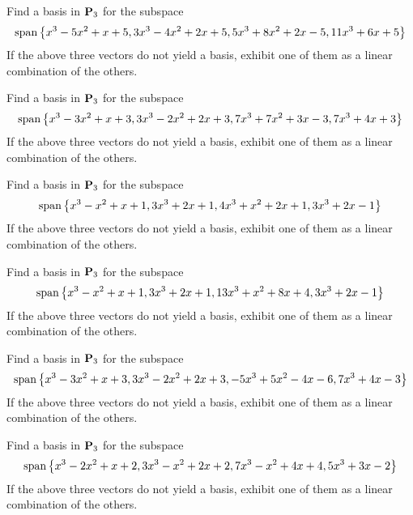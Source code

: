 \begin{ex}
  Find a basis in $\mathbf{P}_{3}$ for the subspace
  \begin{equation*}
    \sspan\set{
      x^{3}-5x^{2}+x+5,3x^{3}-4x^{2}+2x+5,5x^{3}+8x^{2}+2x-5,11x^{3}+6x+5}
  \end{equation*}
  If the above three vectors do not yield a basis, exhibit one of them
  as a linear combination of the others.
\end{ex}

\begin{ex}
  Find a basis in $\mathbf{P}_{3}$ for the subspace
  \begin{equation*}
    \sspan\set{
      x^{3}-3x^{2}+x+3,3x^{3}-2x^{2}+2x+3,7x^{3}+7x^{2}+3x-3,7x^{3}+4x+3}
  \end{equation*}
  If the above three vectors do not yield a basis, exhibit one of them
  as a linear combination of the others.
\end{ex}

\begin{ex}
  Find a basis in $\mathbf{P}_{3}$ for the subspace
  \begin{equation*}
    \sspan\set{
      x^{3}-x^{2}+x+1,3x^{3}+2x+1,4x^{3}+x^{2}+2x+1,3x^{3}+2x-1}
  \end{equation*}
  If the above three vectors do not yield a basis, exhibit one of them
  as a linear combination of the others.
\end{ex}

\begin{ex}
  Find a basis in $\mathbf{P}_{3}$ for the subspace
  \begin{equation*}
    \sspan\set{
      x^{3}-x^{2}+x+1,3x^{3}+2x+1,13x^{3}+x^{2}+8x+4,3x^{3}+2x-1}
  \end{equation*}
  If the above three vectors do not yield a basis, exhibit one of them
  as a linear combination of the others.
\end{ex}

\begin{ex}
  Find a basis in $\mathbf{P}_{3}$ for the subspace
  \begin{equation*}
    \sspan\set{
      x^{3}-3x^{2}+x+3,3x^{3}-2x^{2}+2x+3,-5x^{3}+5x^{2}-4x-6,7x^{3}+4x-3}
  \end{equation*}
  If the above three vectors do not yield a basis, exhibit one of them
  as a linear combination of the others.
\end{ex}

\begin{ex}
  Find a basis in $\mathbf{P}_{3}$ for the subspace
  \begin{equation*}
    \sspan\set{
      x^{3}-2x^{2}+x+2,3x^{3}-x^{2}+2x+2,7x^{3}-x^{2}+4x+4,5x^{3}+3x-2}
  \end{equation*}
  If the above three vectors do not yield a basis, exhibit one of them
  as a linear combination of the others.
\end{ex}

